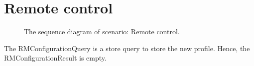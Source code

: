 \section{Remote control}

\begin{figure}
	\begin{centering}
		\caption{The sequence diagram of scenario: Remote control.}
		\label{fig:scenario-5-4}
	\end{centering}
\end{figure}

\npar The RMConfigurationQuery is a store query to store the new profile. Hence,
the RMConfigurationResult is empty.
